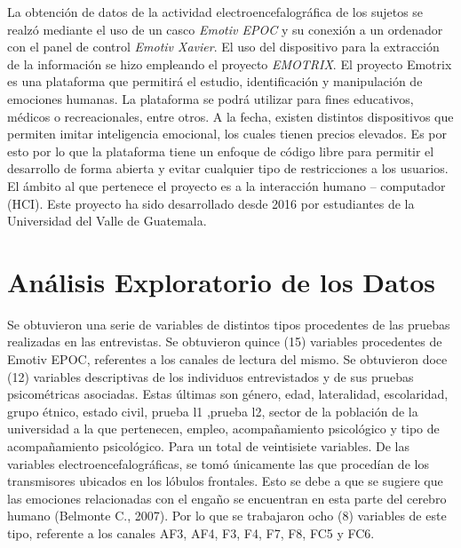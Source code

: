 La obtención de datos de la actividad electroencefalográfica de los sujetos se realzó mediante el uso de un casco \textit{Emotiv EPOC} y su conexión a un ordenador con el panel de control \textit{Emotiv Xavier}. El uso del dispositivo para la extracción de la información se hizo empleando el proyecto \textit{EMOTRIX}. El proyecto Emotrix es una plataforma que permitirá el estudio, identificación y manipulación de emociones humanas. La plataforma se podrá utilizar para fines educativos, médicos o recreacionales, entre otros. A la fecha, existen distintos dispositivos que permiten imitar inteligencia emocional, los cuales tienen precios elevados. Es por esto por lo que la plataforma tiene un enfoque de código libre para permitir el desarrollo de forma abierta y evitar cualquier tipo de restricciones a los usuarios. El ámbito al que pertenece el proyecto es a la interacción humano – computador (HCI). Este proyecto ha sido desarrollado desde 2016 por estudiantes de la Universidad del Valle de Guatemala.

\section{Análisis Exploratorio de los Datos}
Se obtuvieron una serie de variables de distintos tipos procedentes de las pruebas realizadas en las entrevistas. Se obtuvieron quince (15) variables procedentes de Emotiv EPOC, referentes a los canales de lectura del mismo. Se obtuvieron doce (12) variables descriptivas de los individuos entrevistados y de sus pruebas psicométricas asociadas. Estas últimas son género, edad, lateralidad, escolaridad, grupo étnico, estado civil, prueba l1 ,prueba l2, sector de la población de la universidad a la que pertenecen, empleo, acompañamiento psicológico y tipo de acompañamiento psicológico. Para un total de veintisiete variables. De las variables electroencefalográficas, se tomó únicamente las que procedían de los transmisores ubicados en los lóbulos frontales. Esto se debe a que se sugiere que las emociones relacionadas con el engaño se encuentran en esta parte del cerebro humano (Belmonte C., 2007). Por lo que se trabajaron ocho (8) variables de este tipo, referente a los canales AF3, AF4, F3, F4, F7, F8, FC5 y FC6. 

